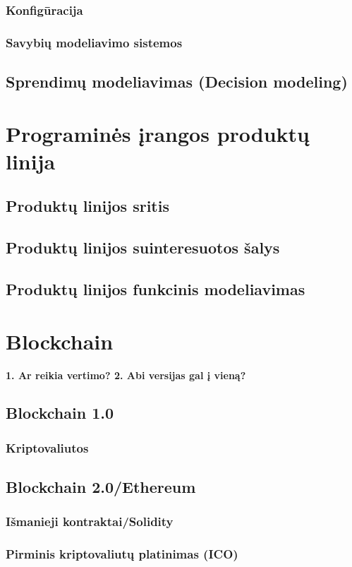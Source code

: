 \documentclass{VUMIFInfKursinis}
\begin{document}
\subsubsection{Konfigūracija}
\subsubsection{Savybių modeliavimo sistemos}
\subsection{Sprendimų modeliavimas (Decision modeling)}
\section{Programinės įrangos produktų linija}
\subsection{Produktų linijos sritis}
\subsection{Produktų linijos suinteresuotos šalys}
\subsection{Produktų linijos funkcinis modeliavimas}
\section{Blockchain}
\textbf{1. Ar reikia vertimo? 2. Abi versijas gal į vieną?}
\subsection{Blockchain 1.0}
\subsubsection{Kriptovaliutos}
\subsection{Blockchain 2.0/Ethereum}
\subsubsection{Išmanieji kontraktai/Solidity}
\subsubsection{Pirminis kriptovaliutų platinimas (ICO)}
\end{document}
